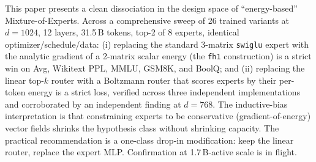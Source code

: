 \documentclass[oneside]{article}
\begin{document}
This paper presents a clean dissociation in the design space of
``energy-based'' Mixture-of-Experts. Across a comprehensive sweep of
26 trained variants at $d{=}1024$, 12 layers, 31.5\,B tokens, top-2 of
8 experts, identical optimizer/schedule/data:
(i) replacing the standard 3-matrix \texttt{swiglu} expert with the
analytic gradient of a 2-matrix scalar energy (the \texttt{fh1}
construction) is a strict win on Avg, Wikitext PPL, MMLU, GSM8K, and
BoolQ; and (ii) replacing the linear top-$k$ router with a Boltzmann
router that scores experts by their per-token energy is a strict
loss, verified across three independent implementations and
corroborated by an independent finding at $d{=}768$. The
inductive-bias interpretation is that constraining experts to be
conservative (gradient-of-energy) vector fields shrinks the
hypothesis class without shrinking capacity. The practical
recommendation is a one-class drop-in modification: keep the linear
router, replace the expert MLP. Confirmation at 1.7\,B-active scale
is in flight.



\end{document}
